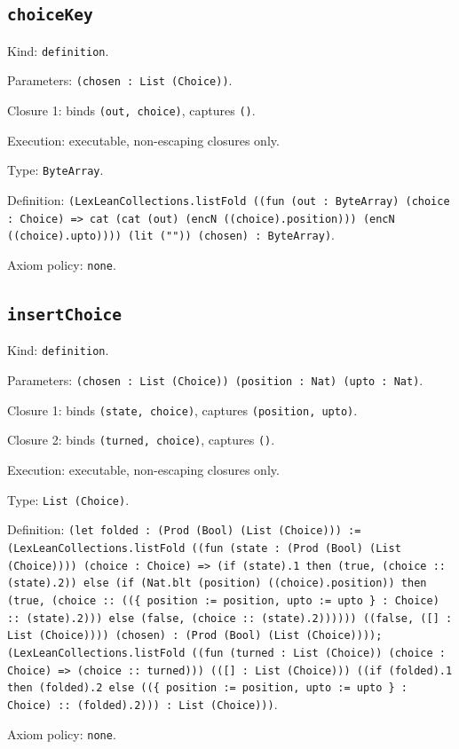 \documentclass[11pt]{article}
\begin{document}
\subsection*{\texttt{choiceKey}}
\noindent Kind: \texttt{definition}.\par
\noindent Parameters: \texttt{(chosen : List (Choice))}.\par
\noindent Closure 1: binds \texttt{(out, choice)}, captures \texttt{()}.\par
\noindent Execution: executable, non-escaping closures only.\par
\noindent Type: \texttt{ByteArray}.\par
\noindent Definition: \texttt{(LexLeanCollections.listFold ((fun (out : ByteArray) (choice : Choice) => cat (cat (out) (encN ((choice).position))) (encN ((choice).upto)))) (lit ("")) (chosen) : ByteArray)}.\par
\noindent Axiom policy: \texttt{none}.\par
\subsection*{\texttt{insertChoice}}
\noindent Kind: \texttt{definition}.\par
\noindent Parameters: \texttt{(chosen : List (Choice)) (position : Nat) (upto : Nat)}.\par
\noindent Closure 1: binds \texttt{(state, choice)}, captures \texttt{(position, upto)}.\par
\noindent Closure 2: binds \texttt{(turned, choice)}, captures \texttt{()}.\par
\noindent Execution: executable, non-escaping closures only.\par
\noindent Type: \texttt{List (Choice)}.\par
\noindent Definition: \texttt{(let folded : (Prod (Bool) (List (Choice))) := (LexLeanCollections.listFold ((fun (state : (Prod (Bool) (List (Choice)))) (choice : Choice) => (if (state).1 then (true, (choice :: (state).2)) else (if (Nat.blt (position) ((choice).position)) then (true, (choice :: ((\{ position := position, upto := upto \} : Choice) :: (state).2))) else (false, (choice :: (state).2)))))) ((false, ([] : List (Choice)))) (chosen) : (Prod (Bool) (List (Choice)))); (LexLeanCollections.listFold ((fun (turned : List (Choice)) (choice : Choice) => (choice :: turned))) (([] : List (Choice))) ((if (folded).1 then (folded).2 else ((\{ position := position, upto := upto \} : Choice) :: (folded).2))) : List (Choice)))}.\par
\noindent Axiom policy: \texttt{none}.\par
\end{document}
